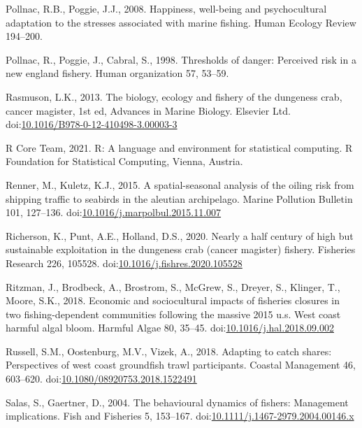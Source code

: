 \documentclass[]{elsarticle} %
\begin{document}
\leavevmode\hypertarget{ref-Pollnac2008}{}%
Pollnac, R.B., Poggie, J.J., 2008. Happiness, well-being and
psychocultural adaptation to the stresses associated with marine
fishing. Human Ecology Review 194--200.

\leavevmode\hypertarget{ref-Pollnac1998}{}%
Pollnac, R., Poggie, J., Cabral, S., 1998. Thresholds of danger:
Perceived risk in a new england fishery. Human organization 57, 53--59.

\leavevmode\hypertarget{ref-Rasmuson2013}{}%
Rasmuson, L.K., 2013. The biology, ecology and fishery of the dungeness
crab, cancer magister, 1st ed, Advances in Marine Biology. Elsevier Ltd.
doi:\href{https://doi.org/10.1016/B978-0-12-410498-3.00003-3}{10.1016/B978-0-12-410498-3.00003-3}

\leavevmode\hypertarget{ref-RCoreTeam2021}{}%
R Core Team, 2021. R: A language and environment for statistical
computing. R Foundation for Statistical Computing, Vienna, Austria.

\leavevmode\hypertarget{ref-Renner2015}{}%
Renner, M., Kuletz, K.J., 2015. A spatial-seasonal analysis of the
oiling risk from shipping traffic to seabirds in the aleutian
archipelago. Marine Pollution Bulletin 101, 127--136.
doi:\href{https://doi.org/10.1016/j.marpolbul.2015.11.007}{10.1016/j.marpolbul.2015.11.007}

\leavevmode\hypertarget{ref-Richerson2020}{}%
Richerson, K., Punt, A.E., Holland, D.S., 2020. Nearly a half century of
high but sustainable exploitation in the dungeness crab (cancer
magister) fishery. Fisheries Research 226, 105528.
doi:\href{https://doi.org/10.1016/j.fishres.2020.105528}{10.1016/j.fishres.2020.105528}

\leavevmode\hypertarget{ref-Ritzman2018}{}%
Ritzman, J., Brodbeck, A., Brostrom, S., McGrew, S., Dreyer, S.,
Klinger, T., Moore, S.K., 2018. Economic and sociocultural impacts of
fisheries closures in two fishing-dependent communities following the
massive 2015 u.s. West coast harmful algal bloom. Harmful Algae 80,
35--45.
doi:\href{https://doi.org/10.1016/j.hal.2018.09.002}{10.1016/j.hal.2018.09.002}

\leavevmode\hypertarget{ref-Russell2018}{}%
Russell, S.M., Oostenburg, M.V., Vizek, A., 2018. Adapting to catch
shares: Perspectives of west coast groundfish trawl participants.
Coastal Management 46, 603--620.
doi:\href{https://doi.org/10.1080/08920753.2018.1522491}{10.1080/08920753.2018.1522491}

\leavevmode\hypertarget{ref-Salas2004}{}%
Salas, S., Gaertner, D., 2004. The behavioural dynamics of fishers:
Management implications. Fish and Fisheries 5, 153--167.
doi:\href{https://doi.org/10.1111/j.1467-2979.2004.00146.x}{10.1111/j.1467-2979.2004.00146.x}
\end{document}
